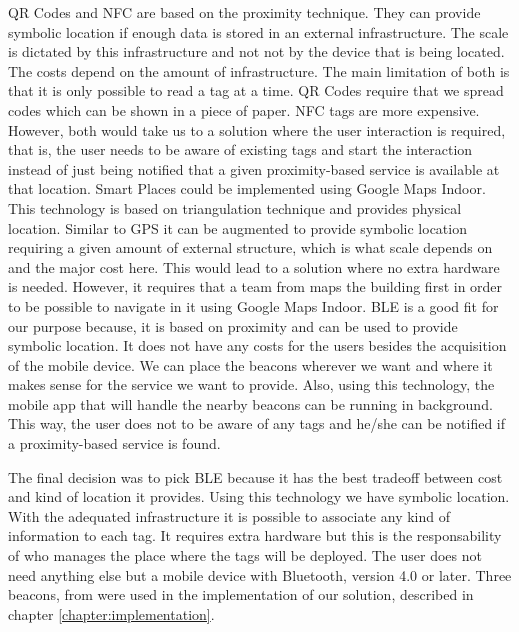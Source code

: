 \gls{QR} Codes and \gls{NFC} are based on the proximity technique.
They can provide symbolic location if enough data is stored in an external infrastructure.
The scale is dictated by this infrastructure and not not by the device that is being located.
The costs depend on the amount of infrastructure.
The main limitation of both is that it is only possible to read a tag at a time.
\gls{QR} Codes require that we spread codes which can be shown in a piece of paper.
\gls{NFC} tags are more expensive.
However, both would take us to a solution where the user interaction is required, that is, the user needs to be aware of existing tags and start the interaction instead of just being notified that a given proximity-based service is available at that location.
Smart Places could be implemented using Google Maps Indoor.
This technology is based on triangulation technique and provides physical location.
Similar to \gls{GPS} it can be augmented to provide symbolic location requiring a given amount of external structure, which is what scale depends on and the major cost here.
This would lead to a solution where no extra hardware is needed.
However, it requires that a team from  maps the building first in order to be possible to navigate in it using Google Maps Indoor.
\gls{BLE} is a good fit for our purpose because, it is based on proximity and can be used to provide symbolic location.
It does not have any costs for the users besides the acquisition of the mobile device.
We can place the beacons wherever we want and where it makes sense for the service we want to provide.
Also, using this technology, the mobile app that will handle the nearby beacons can be running in background.
This way, the user does not to be aware of any tags and he/she can be notified if a proximity-based service is found.

The final decision was to pick \gls{BLE} because it has the best tradeoff between cost and kind of location it provides. Using this technology we have symbolic location. With the adequated infrastructure it is possible to associate any kind of information to each tag.
It requires extra hardware but this is the responsability of who manages the place where the tags will be deployed.
The user does not need anything else but a mobile device with Bluetooth, version 4.0 or later.
Three beacons, from  were used in the implementation of our solution, described in chapter \ref{chapter:implementation}.


